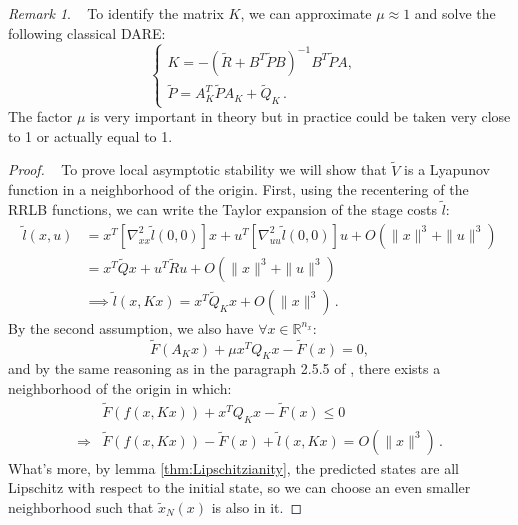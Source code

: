 \documentclass[conference]{IEEEtran}
\theoremstyle{definition}
\theoremstyle{remark}
\newtheorem*{remark}{Remark}
\newcommand{\R}{\mathbb{R}}
\begin{document}
\begin{remark}~
	To identify the matrix $K$, we can approximate $\mu\approx 1$ and solve the following classical DARE:
	\begin{equation}
		\label{eq:modified-DARE}
		\begin{cases}
			K=-(\tilde{R}+B^T\tilde{P} B)^{-1}B^T\tilde{P} A,&\\
			\tilde{P}=A_K^T\tilde{P} A_K+\tilde{Q}_K\,.
		\end{cases}
	\end{equation}
	The factor $\mu$ is very important in theory but in practice could be taken very close to 1 or actually equal to 1.
\end{remark}

\begin{proof}~
	To prove local asymptotic stability we will show that $\tilde{V}$ is a Lyapunov function in a neighborhood of the origin.
	First, using the recentering of the RRLB functions, we can write the Taylor expansion of the stage costs $\tilde{l}$:
	\begin{align*}
		\tilde{l}(x,u)&=x^T[\nabla_{xx}^2\tilde{l}(0,0)] x+u^T[\nabla_{uu}^2\tilde{l}(0,0)]u+O(\|x\|^3+\|u\|^3)\\
		&=x^T\tilde{Q}x+u^T\tilde{R}u+O(\|x\|^3+\|u\|^3)\\
		&\implies\tilde{l}(x,Kx)=x^T\tilde{Q}_Kx+O(\|x\|^3)\,.
	\end{align*}
	By the second assumption, we also have $\forall x\in\R^{n_x}$:
	\begin{equation}
		\tilde{F}(A_Kx)+\mu x^T Q_K x-\tilde{F}(x)=0,
	\end{equation}
	and by the same reasoning as in the paragraph 2.5.5 of \cite{MPC-book}, there exists a neighborhood of the origin in which:
	\begin{align}
		&\tilde{F}(f(x,Kx))+x^T Q_K x-\tilde{F}(x)\leq 0\\
		\Longrightarrow&\tilde{F}(f(x,Kx))-\tilde{F}(x)+\tilde{l}(x,Kx)=O(\|x\|^3)\,.
	\end{align}
	What's more, by lemma \ref{thm:Lipschitzianity}, the predicted states are all Lipschitz with respect to the initial state, so we can choose an even smaller neighborhood such that $\tilde{x}_N(x)$ is also in it.


\end{proof}
\end{document}
